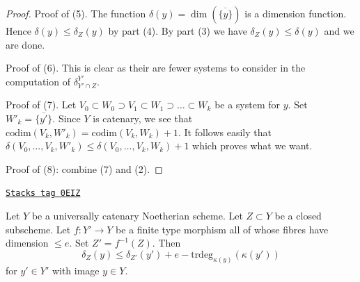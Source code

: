 \begin{proof}
\medskip\noindent
Proof of (5). The function $\delta(y) = \dim(\overline{\{y\}})$
is a dimension function. Hence $\delta(y) \leq \delta_Z(y)$ by
part (4). By part (3) we have $\delta_Z(y) \leq \delta(y)$
and we are done.

\medskip\noindent
Proof of (6). This is clear as their are fewer systems to consider
in the computation of $\delta^{Y'}_{Y' \cap Z}$.

\medskip\noindent
Proof of (7). Let
$V_0 \subset W_0 \supset V_1 \subset W_1 \supset \ldots \subset W_k$
be a system for $y$. Set $W'_k = \overline{\{y'\}}$.
Since $Y$ is catenary, we see that
$\text{codim}(V_k, W'_k) = \text{codim}(V_k, W_k) + 1$.
It follows easily that $\delta(V_0, \ldots, V_k, W'_k) \leq
\delta(V_0, \ldots, V_k, W_k) + 1$ which proves what we want.

\medskip\noindent
Proof of (8): combine (7) and (2).
\end{proof}

\begin{lemma}
\label{algebraization-lemma-change-distance-function}
\href{https://stacks.math.columbia.edu/tag/0EIZ}{\texttt{Stacks tag 0EIZ}}

Let $Y$ be a universally catenary Noetherian scheme. Let $Z \subset Y$
be a closed subscheme. Let $f : Y' \to Y$ be a finite type
morphism all of whose fibres have dimension $\leq e$. Set $Z' = f^{-1}(Z)$.
Then
$$
\delta_Z(y) \leq \delta_{Z'}(y') + e - \text{trdeg}_{\kappa(y)}(\kappa(y'))
$$
for $y' \in Y'$ with image $y \in Y$.
\end{lemma}

